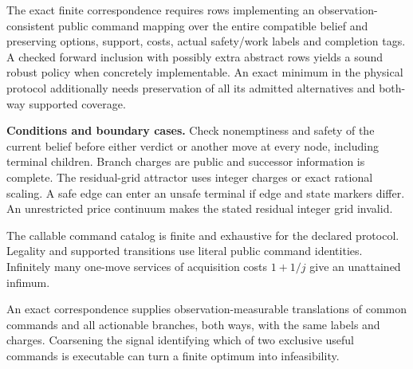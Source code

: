 \begin{theorem}
The exact finite correspondence requires rows implementing an observation-consistent public command mapping over the entire compatible belief and preserving options, support, costs, actual safety/work labels and completion tags. A checked forward inclusion with possibly extra abstract rows yields a sound robust policy when concretely implementable. An exact minimum in the physical protocol additionally needs preservation of all its admitted alternatives and both-way supported coverage.

\textbf{Conditions and boundary cases.} Check nonemptiness and safety of the current belief before either verdict or another move at every node, including terminal children. Branch charges are public and successor information is complete. The residual-grid attractor uses integer charges or exact rational scaling. A safe edge can enter an unsafe terminal if edge and state markers differ. An unrestricted price continuum makes the stated residual integer grid invalid.

The callable command catalog is finite and exhaustive for the declared protocol. Legality and supported transitions use literal public command identities. Infinitely many one-move services of acquisition costs \(1+1/j\) give an unattained infimum.

An exact correspondence supplies observation-measurable translations of common commands and all actionable branches, both ways, with the same labels and charges. Coarsening the signal identifying which of two exclusive useful commands is executable can turn a finite optimum into infeasibility.

\end{theorem}

